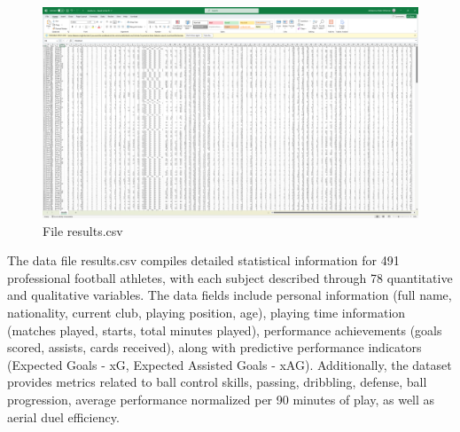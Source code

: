 \documentclass[12pt]{report}
\begin{document}
{\begin{figure}[h]
    \centering
    \includegraphics[width=\textwidth]{results_csv.png}
    \caption{File results.csv} %
    \label{fig:terminal} %
\end{figure}
The data file results.csv compiles detailed statistical information for 491 professional football athletes, with each subject described through 78 quantitative and qualitative variables. The data fields include personal information (full name, nationality, current club, playing position, age), playing time information (matches played, starts, total minutes played), performance achievements (goals scored, assists, cards received), along with predictive performance indicators (Expected Goals - xG, Expected Assisted Goals - xAG). Additionally, the dataset provides metrics related to ball control skills, passing, dribbling, defense, ball progression, average performance normalized per 90 minutes of play, as well as aerial duel efficiency.
}
\end{document}

